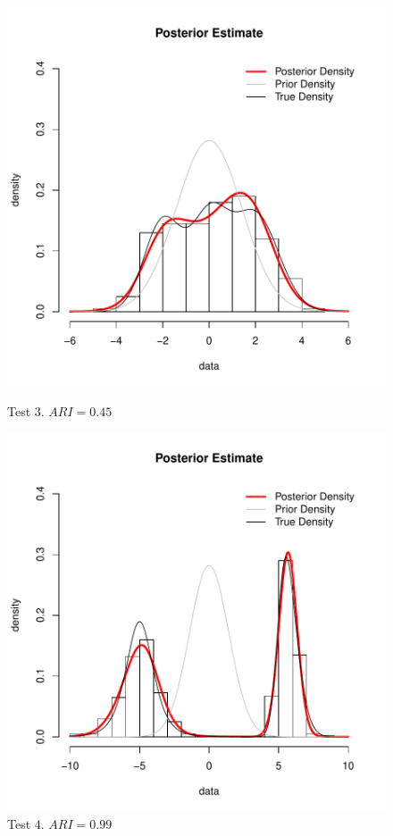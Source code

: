 \begin{figure}[h]
	\centering
	\begin{minipage}{0.5\textwidth}
		\includegraphics[scale=0.4]{etc/test3.pdf}
		\captionsetup{labelformat=empty}
		\caption{Test 3. $ARI = 0.45 $}
	\end{minipage}%
	\begin{minipage}{0.5\textwidth}
		\includegraphics[scale=0.4]{etc/test4.pdf}
		\captionsetup{labelformat=empty}
		\caption{Test 4. $ARI = 0.99$}
	\end{minipage}
\end{figure}

